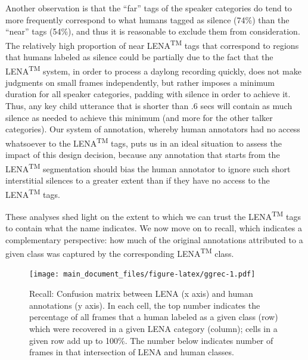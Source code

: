 \documentclass[english,floatsintext,man]{apa6}
\begin{document}
Another observation is that the \enquote{far} tags of the speaker
categories do tend to more frequently correspond to what humans tagged
as silence (74\%) than the \enquote{near} tags (54\%), and thus it is
reasonable to exclude them from consideration. The relatively high
proportion of near LENA\textsuperscript{TM} tags that correspond to
regions that humans labeled as silence could be partially due to the
fact that the LENA\textsuperscript{TM} system, in order to process a
daylong recording quickly, does not make judgments on small frames
independently, but rather imposes a minimum duration for all speaker
categories, padding with silence in order to achieve it. Thus, any key
child utterance that is shorter than .6 secs will contain as much
silence as needed to achieve this minimum (and more for the other talker
categories). Our system of annotation, whereby human annotators had no
access whatsoever to the LENA\textsuperscript{TM} tags, puts us in an
ideal situation to assess the impact of this design decision, because
any annotation that starts from the LENA\textsuperscript{TM}
segmentation should bias the human annotator to ignore such short
interstitial silences to a greater extent than if they have no access to
the LENA\textsuperscript{TM} tags.

These analyses shed light on the extent to which we can trust the
LENA\textsuperscript{TM} tags to contain what the name indicates. We now
move on to recall, which indicates a complementary perspective: how much
of the original annotations attributed to a given class was captured by
the corresponding LENA\textsuperscript{TM} class.

\begin{figure}
\centering
\texttt{[image: main\_document\_files/figure-latex/ggrec-1.pdf]}
\caption{\label{fig:ggrec}Recall: Confusion matrix between LENA (x axis) and
human annotations (y axis). In each cell, the top number indicates the
percentage of all frames that a human labeled as a given class (row)
which were recovered in a given LENA category (column); cells in a given
row add up to 100\%. The number below indicates number of frames in that
intersection of LENA and human classes.}
\end{figure}
\end{document}
